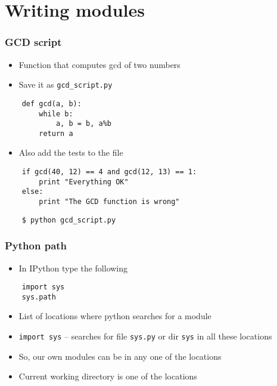 \section{Writing modules}

\begin{frame}[fragile]
  \frametitle{GCD script}
  \begin{itemize}
  \item Function that computes gcd of two numbers
  \item Save it as \texttt{gcd\_script.py}
  \end{itemize}
  \begin{lstlisting}
    def gcd(a, b):
        while b:
            a, b = b, a%b
        return a
  \end{lstlisting}
  \begin{itemize}
  \item Also add the tests to the file
  \end{itemize}
  \begin{lstlisting}
    if gcd(40, 12) == 4 and gcd(12, 13) == 1:
        print "Everything OK"
    else:
        print "The GCD function is wrong"
  \end{lstlisting}
  \begin{lstlisting}
    $ python gcd_script.py
  \end{lstlisting} %
\end{frame}

\begin{frame}[fragile]
  \frametitle{Python path}
  \begin{itemize}
  \item In IPython type the following
  \end{itemize}
  \begin{lstlisting}
    import sys
    sys.path
  \end{lstlisting}
  \begin{itemize}
  \item List of locations where python searches for a module
  \item \texttt{import sys} -- searches for file \texttt{sys.py} or
    dir \texttt{sys} in all these locations
  \item So, our own modules can be in any one of the locations
  \item Current working directory is one of the locations
  \end{itemize}
\end{frame}

